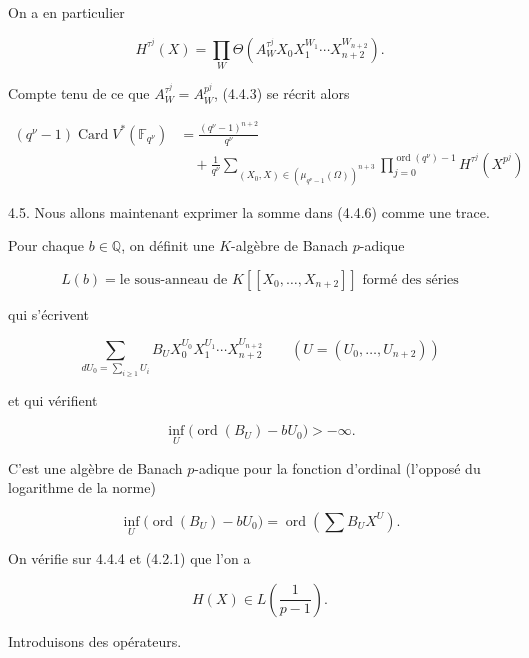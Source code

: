 On a en particulier

\[
H^{\tau^j}(X)=\prod_W
\Theta\!\left(A_W^{\tau^j}X_0X_1^{W_1}\cdots
X_{n+2}^{W_{n+2}}\right).
\]

Compte tenu de ce que $A_W^{\tau^j}=A_W^{p^j}$, (4.4.3) se récrit alors

\begin{equation}\tag{4.4.6}
\begin{aligned}
(q^\nu-1)\operatorname{Card}V^*(\mathbb F_{q^\nu})
&=\frac{(q^\nu-1)^{n+2}}{q^\nu}\\
&\quad+\frac1{q^\nu}
\sum_{(X_0,X)\in(\mu_{q^\nu-1}(\Omega))^{n+3}}
\prod_{j=0}^{\operatorname{ord}(q^\nu)-1}H^{\tau^j}(X^{p^j})
\end{aligned}
\end{equation}

4.5. Nous allons maintenant exprimer la somme dans (4.4.6) comme une trace.

Pour chaque $b\in\mathbb Q$, on définit une $K$-algèbre de Banach $p$-adique

\begin{equation}\tag{4.5.1}
L(b)=\text{le sous-anneau de $K[[X_0,\ldots,X_{n+2}]]$ formé des séries}
\end{equation}

qui s'écrivent

\begin{equation}\tag{4.5.2}
\sum_{dU_0=\sum_{i\geq1}U_i}
B_UX_0^{U_0}X_1^{U_1}\cdots X_{n+2}^{U_{n+2}}
\qquad (U=(U_0,\ldots,U_{n+2}))
\end{equation}

et qui vérifient

\begin{equation}\tag{4.5.3}
\inf_U\bigl(\operatorname{ord}(B_U)-bU_0\bigr)>-\infty.
\end{equation}

C'est une algèbre de Banach $p$-adique pour la fonction d'ordinal
(l'opposé du logarithme de la norme)

\begin{equation}\tag{4.5.4}
\inf_U\bigl(\operatorname{ord}(B_U)-bU_0\bigr)
=\operatorname{ord}\!\left(\sum B_UX^U\right).
\end{equation}

On vérifie sur 4.4.4 et (4.2.1) que l'on a

\[
H(X)\in L\!\left(\frac1{p-1}\right).
\]


Introduisons des opérateurs.

